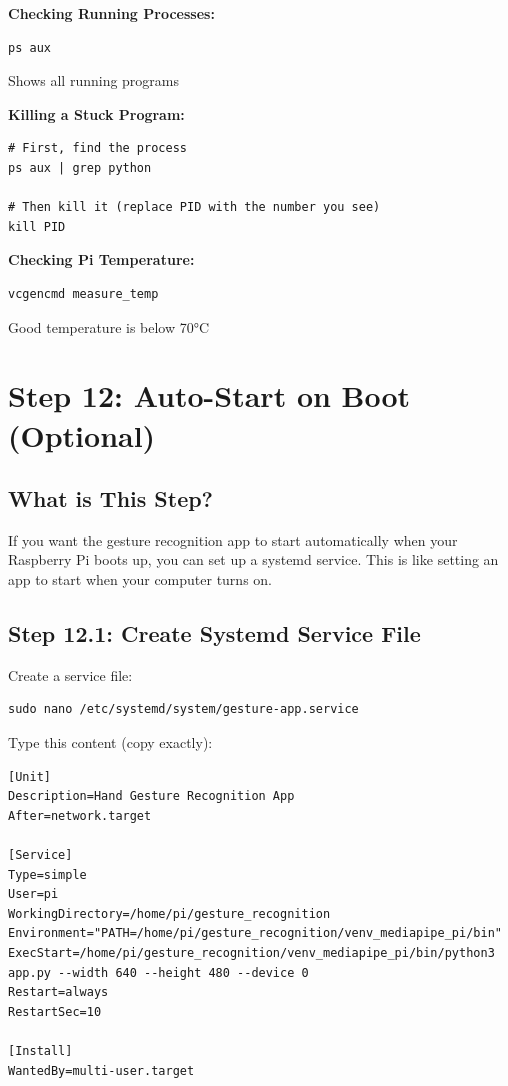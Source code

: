 \documentclass[12pt,a4paper]{article}
\begin{document}
\textbf{Checking Running Processes:}
\begin{lstlisting}
ps aux
\end{lstlisting}
Shows all running programs

\textbf{Killing a Stuck Program:}
\begin{lstlisting}
# First, find the process
ps aux | grep python

# Then kill it (replace PID with the number you see)
kill PID
\end{lstlisting}

\textbf{Checking Pi Temperature:}
\begin{lstlisting}
vcgencmd measure_temp
\end{lstlisting}
Good temperature is below 70°C

\section{Step 12: Auto-Start on Boot (Optional)}

\subsection{What is This Step?}

If you want the gesture recognition app to start automatically when your Raspberry Pi boots up, you can set up a systemd service. This is like setting an app to start when your computer turns on.

\subsection{Step 12.1: Create Systemd Service File}

Create a service file:
\begin{lstlisting}
sudo nano /etc/systemd/system/gesture-app.service
\end{lstlisting}

Type this content (copy exactly):
\begin{lstlisting}
[Unit]
Description=Hand Gesture Recognition App
After=network.target

[Service]
Type=simple
User=pi
WorkingDirectory=/home/pi/gesture_recognition
Environment="PATH=/home/pi/gesture_recognition/venv_mediapipe_pi/bin"
ExecStart=/home/pi/gesture_recognition/venv_mediapipe_pi/bin/python3 app.py --width 640 --height 480 --device 0
Restart=always
RestartSec=10

[Install]
WantedBy=multi-user.target
\end{lstlisting}
\end{document}
